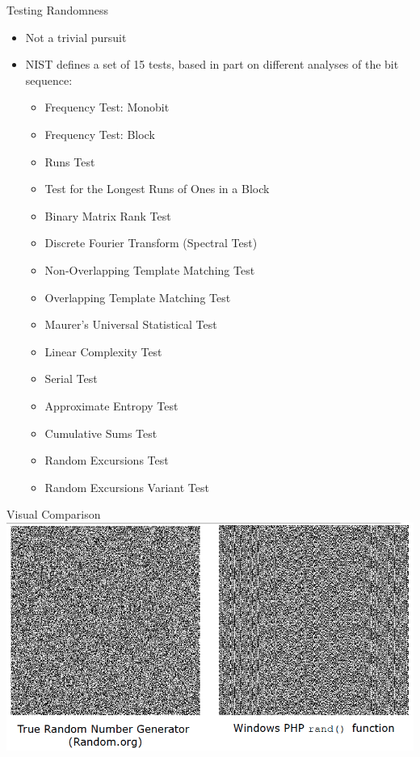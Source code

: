 \documentclass[xcolor=x11names,compress]{beamer}
\renewcommand{\(}{\begin{columns}}
\renewcommand{\)}{\end{columns}}
\newcommand{\<}[1]{\begin{column}{#1}}
\renewcommand{\>}{\end{column}}
\begin{document}
\begin{frame}{Testing Randomness}
\begin{itemize}
\item Not a trivial pursuit
\item NIST defines a set of 15 tests, based in part on different analyses of the bit sequence:
\begin{itemize}
\item Frequency Test: Monobit
\item Frequency Test: Block
\item Runs Test
\item Test for the Longest Runs of Ones in a Block
\item Binary Matrix Rank Test
\item Discrete Fourier Transform (Spectral Test)
\item Non-Overlapping Template Matching Test
\item Overlapping Template Matching Test
\item Maurer's Universal Statistical Test
\item Linear Complexity Test
\item Serial Test
\item Approximate Entropy Test
\item Cumulative Sums Test
\item Random Excursions Test
\item Random Excursions Variant Test
\end{itemize}  	
\end{itemize}  	
\end{frame}

\begin{frame}{Visual Comparison}
\includegraphics[scale=0.4]{rng1}
\end{frame}
\end{document}
